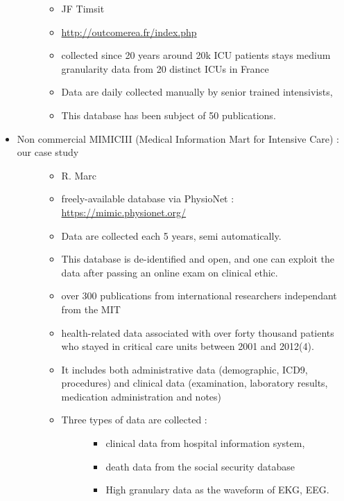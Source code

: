 \begin{itemize}
\begin{description}
\begin{itemize}
  \tightlist
  \item
    JF Timsit
  \item
    \url{http://outcomerea.fr/index.php}
  \item
    collected since 20 years around 20k ICU patients stays medium
    granularity data from 20 distinct ICUs in France
  \item
    Data are daily collected manually by senior trained intensivists,
  \item
    This database has been subject of 50 publications.
  \end{itemize}
  \end{description}
\item
  \begin{description}
  \item[Non commercial MIMICIII (Medical Information Mart for Intensive
  Care) : our case study]
  \begin{itemize}
  \item
    R. Marc
  \item
    freely-available database via PhysioNet :
    \url{https://mimic.physionet.org/}
  \item
    Data are collected each 5 years, semi automatically.
  \item
    This database is de-identified and open, and one can exploit the
    data after passing an online exam on clinical ethic.
  \item
    over 300 publications from international researchers independant
    from the MIT
  \item
    health-related data associated with over forty thousand patients who
    stayed in critical care units between 2001 and 2012(4).
  \item
    It includes both administrative data (demographic, ICD9, procedures)
    and clinical data (examination, laboratory results, medication
    administration and notes)
  \item
    \begin{description}
    \item[Three types of data are collected :]
    \begin{itemize}
    \tightlist
    \item
      clinical data from hospital information system,
    \item
      death data from the social security database
    \item
      High granulary data as the waveform of EKG, EEG.
    \end{itemize}
    \end{description}
  \end{itemize}
  \end{description}
\end{itemize}

